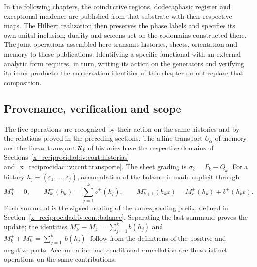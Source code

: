 In the following chapters, the coinductive regions, dodecaphasic register and exceptional incidence are published from that substrate with their respective maps. The Hilbert realization then preserves the phase labels and specifies its own unital inclusion; duality and screens act on the codomains constructed there. The joint operations assembled here transmit histories, sheets, orientation and memory to those publications. Identifying a specific functional with an external analytic form requires, in turn, writing its action on the generators and verifying its inner products: the conservation identities of this chapter do not replace that composition.

\subsection{Provenance, verification and scope}
\label{x_reciprocidad:iv:cont:mapa-correlativo}
The five operations are recognized by their action on the same
histories and by the relations proved in the preceding sections.
The affine transport \(U_\alpha\) of memory and the linear
transport \(\mathcal U_k\) of histories have the respective
domains of Sections~\ref{x_reciprocidad:iv:cont:historias}
and~\ref{x_reciprocidad:iv:cont:transporte}. The sheet grading is
\(\sigma_k=P_k-Q_k\). For a history
\(h_j=(\varepsilon_1,\ldots,\varepsilon_j)\), accumulation of the
balance is made explicit through
\[
 M_0^\pm=0,\qquad
 M_k^\pm(h_k)=\sum_{j=1}^k b^\pm(h_j),\qquad
 M_{k+1}^\pm(h_k\varepsilon)
 =M_k^\pm(h_k)+b^\pm(h_k\varepsilon).
\]
Each summand is the signed reading of the corresponding prefix,
defined in Section~\ref{x_reciprocidad:iv:cont:balance}. Separating the last
summand proves the update; the identities
\(M_k^+-M_k^-=\sum_{j=1}^kb(h_j)\) and
\(M_k^++M_k^-=\sum_{j=1}^k|b(h_j)|\) follow from the
definitions of the positive and negative parts. Accumulation and
conditional cancellation are thus distinct operations on the
same contributions.

